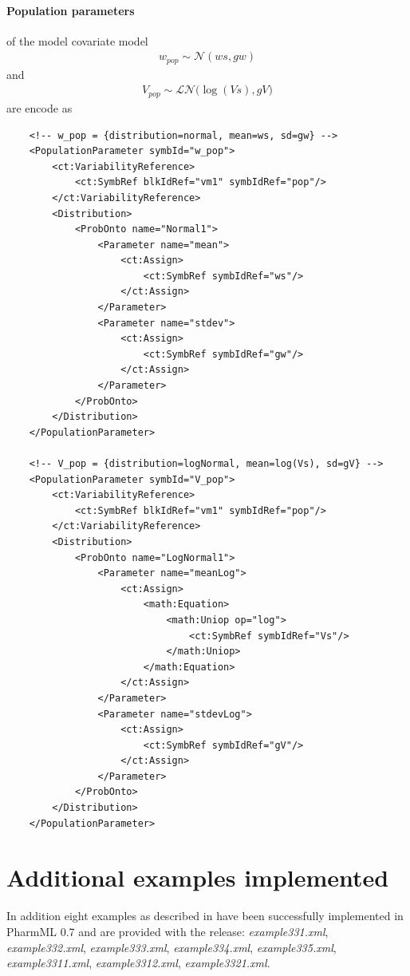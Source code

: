 \paragraph{Population parameters} of the model covariate model 
\begin{align*}
 w_{pop} \sim \mathcal {N}(ws, gw)
\end{align*}
and
\begin{align*}
 V_{pop} \sim \mathcal {LN}\big(\log(V\!s), gV\big)
\end{align*}
are encode as
\lstset{language=XML}
\begin{lstlisting}
    <!-- w_pop = {distribution=normal, mean=ws, sd=gw} -->
    <PopulationParameter symbId="w_pop">
        <ct:VariabilityReference>
            <ct:SymbRef blkIdRef="vm1" symbIdRef="pop"/>
        </ct:VariabilityReference>
        <Distribution>
            <ProbOnto name="Normal1">
                <Parameter name="mean">
                    <ct:Assign>
                        <ct:SymbRef symbIdRef="ws"/>
                    </ct:Assign>
                </Parameter>
                <Parameter name="stdev">
                    <ct:Assign>
                        <ct:SymbRef symbIdRef="gw"/>
                    </ct:Assign>
                </Parameter>
            </ProbOnto>
        </Distribution>
    </PopulationParameter>

    <!-- V_pop = {distribution=logNormal, mean=log(Vs), sd=gV} -->
    <PopulationParameter symbId="V_pop">
        <ct:VariabilityReference>
            <ct:SymbRef blkIdRef="vm1" symbIdRef="pop"/>
        </ct:VariabilityReference>
        <Distribution>
            <ProbOnto name="LogNormal1">
                <Parameter name="meanLog">
                    <ct:Assign>
                        <math:Equation>
                            <math:Uniop op="log">
                                <ct:SymbRef symbIdRef="Vs"/>
                            </math:Uniop>
                        </math:Equation>
                    </ct:Assign>
                </Parameter>
                <Parameter name="stdevLog">
                    <ct:Assign>
                        <ct:SymbRef symbIdRef="gV"/>
                    </ct:Assign>
                </Parameter>
            </ProbOnto>
        </Distribution>
    </PopulationParameter>
\end{lstlisting}


\section{Additional examples implemented}
In addition eight examples as described in \cite{Chiudinelli2015} have been 
successfully implemented in PharmML 0.7 and are provided with the release:
\emph{example331.xml}, \emph{example332.xml}, \emph{example333.xml}, 
\emph{example334.xml}, \emph{example335.xml}, \emph{example3311.xml},
\emph{example3312.xml}, \emph{example3321.xml}.




